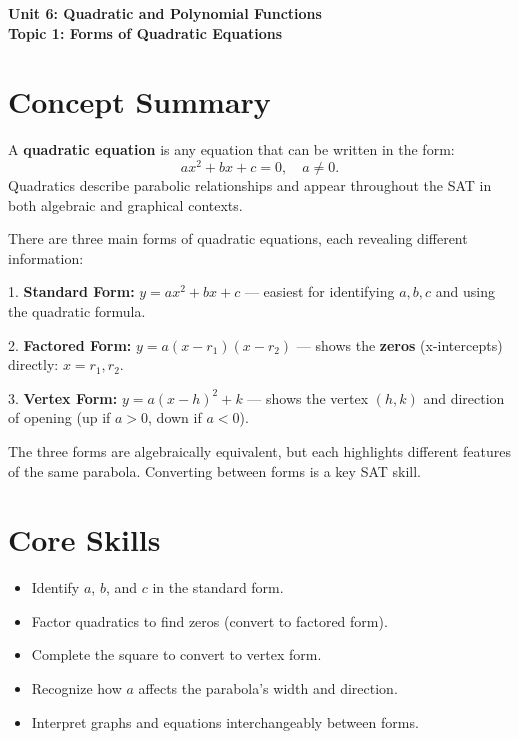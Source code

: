 \documentclass[12pt]{article}
\begin{document}
\begin{center}
    \LARGE \textbf{Unit 6: Quadratic and Polynomial Functions} \\[6pt]
    \Large \textbf{Topic 1: Forms of Quadratic Equations}
\end{center}

\vspace{1em}

\section*{Concept Summary}

A \textbf{quadratic equation} is any equation that can be written in the form:
\[
ax^2 + bx + c = 0, \quad a \ne 0.
\]
Quadratics describe parabolic relationships and appear throughout the SAT in both algebraic and graphical contexts.

There are three main forms of quadratic equations, each revealing different information:

1. \textbf{Standard Form:} \(y = ax^2 + bx + c\)  
   — easiest for identifying \(a, b, c\) and using the quadratic formula.

2. \textbf{Factored Form:} \(y = a(x - r_1)(x - r_2)\)  
   — shows the \textbf{zeros} (x-intercepts) directly: \(x = r_1, r_2.\)

3. \textbf{Vertex Form:} \(y = a(x - h)^2 + k\)  
   — shows the vertex \((h, k)\) and direction of opening (up if \(a > 0\), down if \(a < 0\)).

The three forms are algebraically equivalent, but each highlights different features of the same parabola. Converting between forms is a key SAT skill.

\section*{Core Skills}
\begin{itemize}
  \item Identify \(a\), \(b\), and \(c\) in the standard form.
  \item Factor quadratics to find zeros (convert to factored form).
  \item Complete the square to convert to vertex form.
  \item Recognize how \(a\) affects the parabola’s width and direction.
  \item Interpret graphs and equations interchangeably between forms.
\end{itemize}
\end{document}

